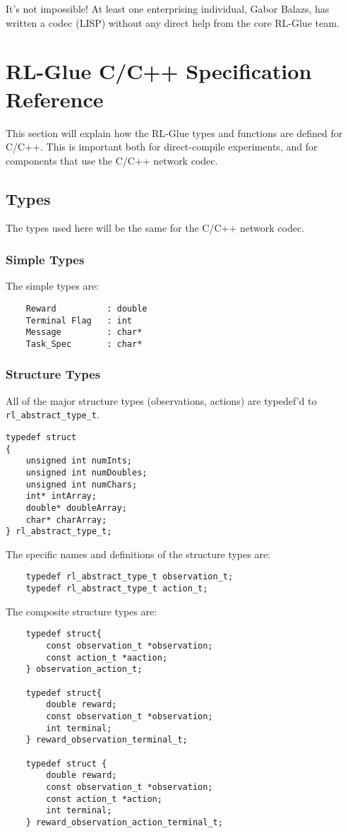 \documentclass[11pt]{article}
\begin{document}
It's not impossible!  At least one enterprising individual, Gabor Balazs, has written a codec (LISP) without any direct help from the core RL-Glue team.  

\section{RL-Glue C/C++ Specification Reference}
This section will explain how the RL-Glue types and functions are defined for C/C++.  This is important both for direct-compile experiments, and for components that
 use the C/C++ network codec.

\subsection{Types}
The types used here will be the same for the C/C++ network codec.

\subsubsection{Simple Types}
The simple types are:

\begin{verbatim}
    Reward          : double
    Terminal Flag   : int
    Message         : char*
    Task_Spec       : char*
\end{verbatim}

\def\rat{rl\_abstract\_type\_t}

\subsubsection{Structure Types}
\label{sec:structure-types}
All of the major structure types (observations, actions) are typedef'd to \texttt{\rat}.

\begin{verbatim}
typedef struct
{
    unsigned int numInts;
    unsigned int numDoubles;
    unsigned int numChars;
    int* intArray;
    double* doubleArray;
    char* charArray;
} rl_abstract_type_t;
\end{verbatim}

The specific names and definitions of the structure types are:
\begin{verbatim}
    typedef rl_abstract_type_t observation_t;
    typedef rl_abstract_type_t action_t;
\end{verbatim}

The composite structure types are:
\begin{verbatim}
	typedef struct{
	    const observation_t *observation;
	    const action_t *aaction;
	} observation_action_t;

	typedef struct{
	    double reward;
	    const observation_t *observation;
	    int terminal;
	} reward_observation_terminal_t;

	typedef struct {
	    double reward;
	    const observation_t *observation;
	    const action_t *action;
	    int terminal;
	} reward_observation_action_terminal_t;
\end{verbatim}
\end{document}
